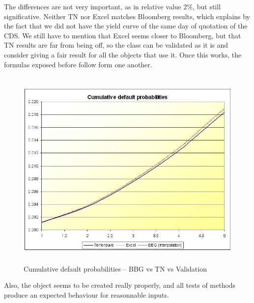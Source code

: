 The differences are not very important, as in relative value $2\%$, but still significative. Neither TN nor Excel matches Bloomberg results, which explains by the fact that we did not have the yield curve of the same day of quotation of the CDS. We still have to mention that Excel seems closer to Bloomberg, but that TN results are far from being off, so the class can be validated as it is and consider giving a fair result for all the objects that use it. Once this works, the formulas exposed before follow form one another.

\begin{figure}
\begin{center}
        \includegraphics[width=14cm,height=10cm]{CumDefProbasYann.jpg}
        \caption{Cumulative default probabilities -- BBG vs TN vs Validation}
\end{center}
\end{figure}

Also, the object seems to be created really properly, and all tests of methods produce an expected behaviour for reasonnable inputs.
